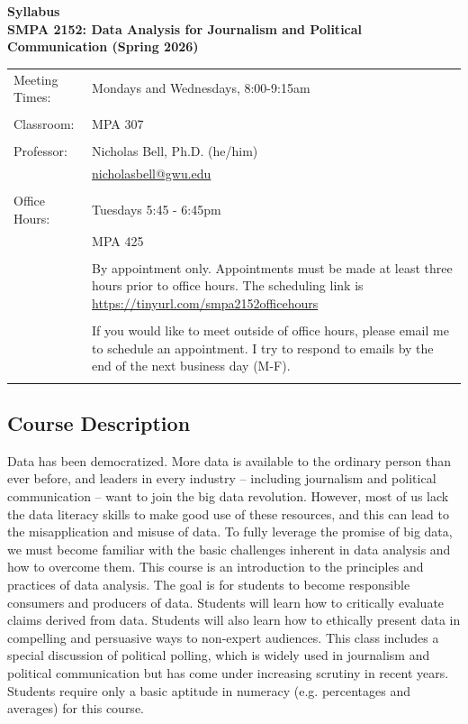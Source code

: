 \documentclass[12pt,letterpaper]{article}
\begin{document}
\begin{center}
  \large
  \textbf{Syllabus\\
    \bigskip
    SMPA 2152: Data Analysis for Journalism and Political Communication
  (Spring 2026)}
\end{center}

\begin{tabularx}{\textwidth}{l>{\raggedright\arraybackslash}X}
  Meeting Times: & Mondays and Wednesdays, 8:00-9:15am \\
  \\
  Classroom: & MPA 307 \\
  \\
  Professor: & Nicholas Bell, Ph.D. (he/him) \\
  & \href{mailto:nicholasbell@gwu.edu}{nicholasbell@gwu.edu} \\
  \\
  Office Hours: & Tuesdays 5:45 - 6:45pm \\
  & MPA 425 \\
  & \\
  & By appointment only. Appointments must be made at least three
  hours prior to office hours. The scheduling link is
  \href{https://tinyurl.com/smpa2152officehours}{https://tinyurl.com/smpa2152officehours}
  \\
  & \\
  & If you would like to meet outside of office hours, please email
  me to schedule an appointment. I try to respond to emails by the
  end of the next business day (M-F).\\
  \\
  \hline
\end{tabularx}

\subsection*{Course Description}

Data has been democratized. More data is available to the ordinary
person than ever before, and leaders in every industry -- including
journalism and political communication -- want to join the big data
revolution. However, most of us lack the data literacy skills to make
good use of these resources, and this can lead to the misapplication
and misuse of data. To fully leverage the promise of big data, we
must become familiar with the basic challenges inherent in data
analysis and how to overcome them. This course is an introduction to
the principles and practices of data analysis. The goal is for
students to become responsible consumers and producers of data.
Students will learn how to critically evaluate claims derived from
data. Students will also learn how to ethically present data in
compelling and persuasive ways to non-expert audiences. This class
includes a special discussion of political polling, which is widely
used in journalism and political communication but has come under
increasing scrutiny in recent years. Students require only a basic
aptitude in numeracy (e.g. percentages and averages) for this course. \par
\end{document}
